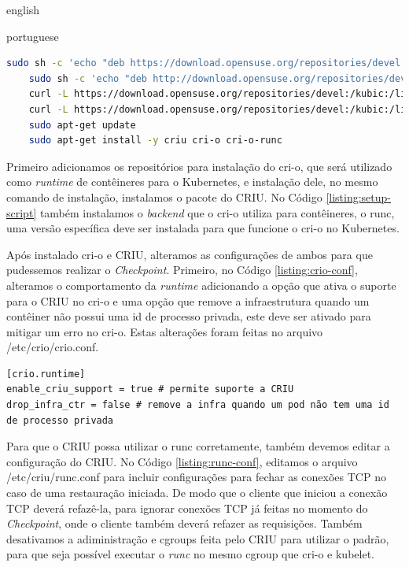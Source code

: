 \begin{otherlanguage*}{english}
\begin{otherlanguage*}{portuguese}
\begin{lstlisting}[language=bash,caption={Comandos de configuração da máquina para CRIU e cri-o.},label={listing:setup-script}]
   sudo sh -c 'echo "deb https://download.opensuse.org/repositories/devel:/kubic:/libcontainers:/stable/xUbuntu_20.04/ /" > /etc/apt/sources.list.d/devel:kubic:libcontainers:stable.list'
	sudo sh -c 'echo "deb http://download.opensuse.org/repositories/devel:/kubic:/libcontainers:/stable:/cri-o:/1.25/xUbuntu_20.04/ /" > /etc/apt/sources.list.d/devel:kubic:libcontainers:stable:cri-o:$CRIO_VERSION.list'
	curl -L https://download.opensuse.org/repositories/devel:/kubic:/libcontainers:/stable:/cri-o:/1.25/xUbuntu_20.04/Release.key | sudo apt-key add -
	curl -L https://download.opensuse.org/repositories/devel:/kubic:/libcontainers:/stable/xUbuntu_20.04/Release.key | sudo apt-key add -
	sudo apt-get update
	sudo apt-get install -y criu cri-o cri-o-runc
\end{lstlisting}

Primeiro adicionamos os repositórios para instalação do cri-o, que será utilizado como
\textit{runtime} de contêineres para o Kubernetes, e instalação dele, no mesmo comando
de instalação, instalamos o pacote do CRIU. No Código \ref{listing:setup-script} também
instalamos o \textit{backend} que o cri-o utiliza para contêineres, o runc, uma versão
específica deve ser instalada para que funcione o cri-o no Kubernetes.

Após instalado cri-o e CRIU, alteramos as configurações de ambos para que pudessemos
realizar o \textit{Checkpoint}. Primeiro, no Código \ref{listing:crio-conf}, alteramos
o comportamento da \textit{runtime} adicionando a opção que ativa o suporte para o CRIU
no cri-o e uma opção que remove a infraestrutura quando um contêiner não possui uma id de
processo privada, este deve ser ativado para mitigar um erro no cri-o. Estas alterações
foram feitas no arquivo /etc/crio/crio.conf.

\begin{lstlisting}[language=plaintext,caption={Configuração a ser incluída no arquivo de configurações do cri-o.},label={listing:crio-conf}]
[crio.runtime]
enable_criu_support = true # permite suporte a CRIU
drop_infra_ctr = false # remove a infra quando um pod não tem uma id de processo privada
\end{lstlisting}

Para que o CRIU possa utilizar o runc corretamente, também devemos editar a configuração
do CRIU. No Código \ref{listing:runc-conf}, editamos o arquivo /etc/criu/runc.conf para 
incluir configurações para fechar as conexões TCP no caso de uma restauração iniciada.
De modo que o cliente que iniciou a conexão TCP deverá refazê-la, para ignorar conexões
TCP já feitas no momento do \textit{Checkpoint}, onde o cliente também deverá refazer as
requisições. Também desativamos a adiministração e cgroups feita pelo CRIU para utilizar o padrão,
para que seja possível executar o \textit{runc} no mesmo cgroup que cri-o e kubelet.


\end{otherlanguage*}
\end{otherlanguage*}
